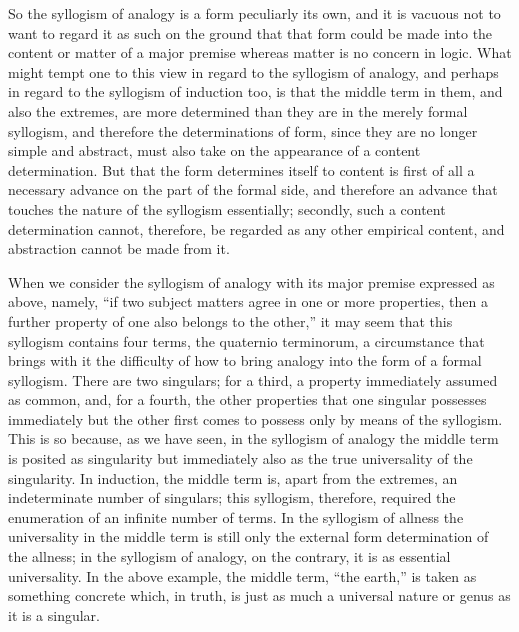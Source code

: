 So the syllogism of analogy is a form peculiarly its own,
and it is vacuous not to want to regard it as such
on the ground that that form could be made into the content or
matter of a major premise
whereas matter is no concern in logic.
What might tempt one to this view in regard to the syllogism of analogy,
and perhaps in regard to the syllogism of induction too,
is that the middle term in them, and also the extremes,
are more determined than they are in the
merely formal syllogism,
and therefore the determinations of form,
since they are no longer simple and abstract,
must also take on the appearance of a content determination.
But that the form determines itself to content is
first of all a necessary advance on the part of the formal side, and therefore
an advance that touches the nature of the syllogism essentially;
secondly, such a content determination cannot, therefore,
be regarded as any other empirical content,
and abstraction cannot be made from it.

When we consider the syllogism of analogy
with its major premise expressed as above, namely,
“if two subject matters agree in one or more properties,
then a further property of one also belongs to the other,”
it may seem that this syllogism contains four terms,
the quaternio terminorum,
a circumstance that brings with it the difficulty of
how to bring analogy into the form of a formal syllogism.
There are two singulars;
for a third, a property immediately assumed as common,
and, for a fourth, the other properties
that one singular possesses immediately
but the other first comes to possess
only by means of the syllogism.
This is so because, as we have seen,
in the syllogism of analogy
the middle term is posited as singularity
but immediately also as the true
universality of the singularity.
In induction, the middle term is,
apart from the extremes,
an indeterminate number of singulars;
this syllogism, therefore, required the enumeration
of an infinite number of terms.
In the syllogism of allness the universality
in the middle term is still only
the external form determination of the allness;
in the syllogism of analogy, on the contrary,
it is as essential universality.
In the above example, the middle term, “the earth,”
is taken as something concrete which, in truth,
is just as much a universal nature or genus
as it is a singular.

